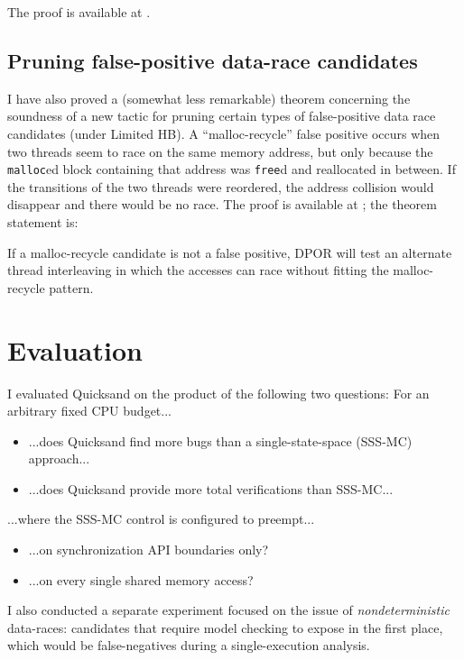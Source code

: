The proof is available at \cite{quicksand-soundness}.

\subsection{Pruning false-positive data-race candidates}
I have also proved a (somewhat less remarkable) theorem concerning the soundness of a new tactic for pruning certain types of false-positive data race candidates (under Limited HB).
A ``malloc-recycle'' false positive occurs when two threads seem to race on the same memory address, but only because the {\tt malloc}ed block containing that address was {\tt free}d and reallocated in between.
If the transitions of the two threads were reordered, the address collision would disappear and there would be no race.
The proof is available at \cite{quicksand-soundness}; the theorem statement is:

\begin{theorem}
	If a malloc-recycle candidate is not a false positive,
	DPOR will test an alternate thread interleaving in which the
	accesses can race without fitting the malloc-recycle pattern.
\end{theorem}


\section{Evaluation}
\label{sec:quicksand-eval}

I evaluated Quicksand on the product of the following two questions: For an arbitrary fixed CPU budget...

\begin{itemize}
	\item ...does Quicksand find more bugs than a single-state-space (SSS-MC) approach...
	\item ...does Quicksand provide more total verifications than SSS-MC...
\end{itemize}
...where the SSS-MC control is configured to preempt...
\begin{itemize}
	\item ...on synchronization API boundaries only?
	\item ...on every single shared memory access?
\end{itemize}

I also conducted a separate experiment focused on the issue of {\em nondeterministic} data-races:
candidates that require model checking to expose in the first place, which would be
false-negatives during a single-execution analysis.

